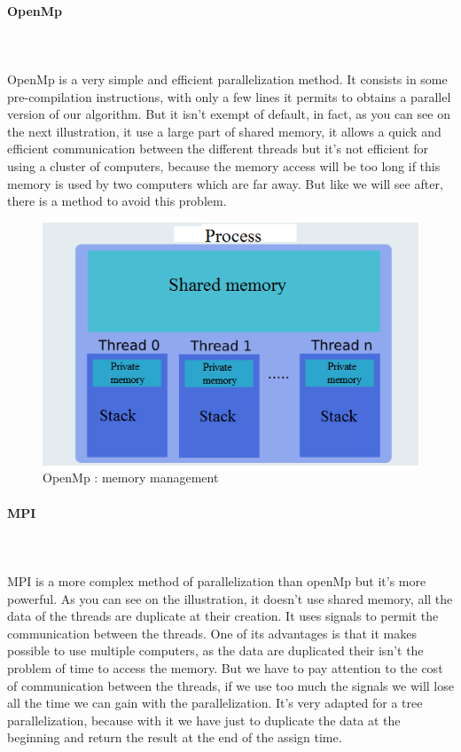 \paragraph{OpenMp}\mbox{}\\\mbox{}\\
	OpenMp is a very simple and efficient parallelization method. It consists in some pre-compilation instructions, with only a few lines it permits to obtains a parallel version of our algorithm. But it isn't exempt of default, in fact, as you can see on the next illustration, it use a large part of shared memory, it allows a quick and efficient communication between the different threads but it's not efficient for using a cluster of computers, because the memory access will be too long if this memory is used by two computers which are far away. But like we will see after, there is a method to avoid this problem.
\begin{figure}[!h] 
\centerline{\includegraphics[scale=0.50]{3_Software_considered/MultithreadingMP_boost_Visual_MPI_5000_Zotero_Project_Baptiste/OpenMP}}
   \caption{\label{étiquette} OpenMp : memory management}
\end{figure}
\newpage
\paragraph{MPI}\mbox{}\\\mbox{}\\
	MPI is a more complex method of parallelization than openMp but it's more powerful. As you can see on the illustration, it doesn't use shared memory, all the data of the threads are duplicate at their creation. It uses signals to permit the communication between the threads. One of its advantages is that it makes possible to use multiple computers, as the data are duplicated their isn't the problem of time to access the memory. But we have to pay attention to the cost of communication between the threads, if we use too much the signals we will lose all the time we can gain with the parallelization. It's very adapted for a tree parallelization, because with it we have just to duplicate the data at the beginning and return the result at the end of the assign time.

